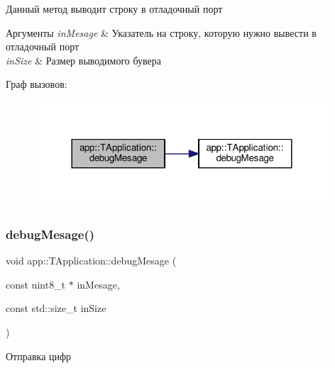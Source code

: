 Данный метод выводит строку в отладочный порт 
\begin{DoxyParams}{Аргументы}
{\em in\+Mesage} & Указатель на строку, которую нужно вывести в отладочный порт \\
\hline
{\em in\+Size} & Размер выводимого бувера \\
\hline
\end{DoxyParams}
Граф вызовов\+:\nopagebreak
\begin{figure}[H]
\begin{center}
\leavevmode
\includegraphics[width=312pt]{classapp_1_1_t_application_a136a0f8acf017467e50018c00bad3d24_cgraph}
\end{center}
\end{figure}
\mbox{\label{classapp_1_1_t_application_a0c44fe0e56bc2d85720155880c9b54a6}} 
\subsubsection{\texorpdfstring{debug\+Mesage()}{debugMesage()}\hspace{0.1cm}{\footnotesize\ttfamily [3/4]}}
{\footnotesize\ttfamily void app\+::\+T\+Application\+::debug\+Mesage (\begin{DoxyParamCaption}\item[{const uint8\+\_\+t $\ast$}]{in\+Mesage,  }\item[{const std\+::size\+\_\+t}]{in\+Size }\end{DoxyParamCaption})}



Отправка цифр 



